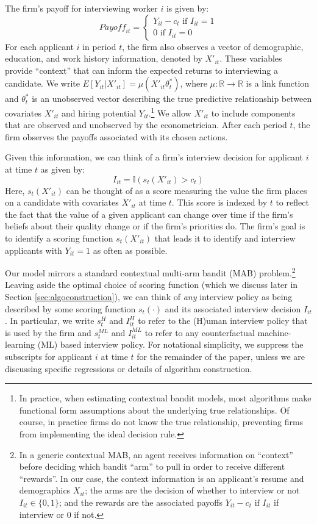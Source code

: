 \documentclass[crop,noquery,editorname,historyrev,nosurname,runningno,sepcount]{RESTUD}
\begin{document}
The firm's payoff for interviewing worker $i$ is given by:
$$
\textit{Payoff}_{it}=
\begin{cases}
Y_{it}-c_t \text{ if } I_{it}=1\\
0 \text{ if } I_{it}=0
\end{cases}
$$
For each applicant $i$ in period $t$, the firm also observes a vector of demographic, education, and work history information, denoted by $X'_{it}$.  These variables provide ``context'' that can inform the expected returns to interviewing a candidate.  We write $E[Y_{it} | X'_{it}]= \mu(X'_{it}\theta_t^*)$, where $\mu: \mathbb{R} \to \mathbb{R}$ is a link function and $\theta_t^*$ is an unobserved vector describing the true predictive relationship between covariates $X'_{it}$ and hiring potential $Y_{it}$.\footnote{In practice, when estimating contextual bandit models, most algorithms make functional form assumptions about the underlying true relationships. Of course, in practice firms do not know the true relationship, preventing firms from implementing the ideal decision rule. } We allow $X'_{it}$ to include components that are observed and unobserved by the econometrician.  After each period $t$, the firm observes the payoffs associated with its chosen actions. 

Given this information, we can think of a firm's interview decision for applicant $i$ at time $t$ as given by:
\begin{equation} \label{interviewpolicy}
I_{it}=\mathbb{I}(s_t(X'_{it}) > c_t)
\end{equation}
Here, $s_t(X'_{it})$ can be thought of as a score measuring the value the firm places on a candidate with covariates $X'_{it}$ at time $t$. This score is indexed by $t$ to reflect the fact that the value of a given applicant can change over time if the firm's beliefs about their quality change or if the firm's priorities do.  The firm's goal is to identify a scoring function $s_t(X'_{it})$ that leads it to identify and interview applicants with $Y_{it}=1$ as often as possible.  

Our model mirrors a standard contextual multi-arm bandit (MAB) problem.\footnote{In a generic contextual MAB, an agent receives information on ``context'' before deciding which bandit ``arm'' to pull in order to receive different ``rewards''.  In our case, the context information is an applicant's resume and demographics $X_{it}$; the arms are the decision of whether to interview or not $I_{it} \in \{0, 1\}$; and the rewards are the associated payoffs $Y_{it}-c_t \text{ if } I_{it}$ if interview or 0 if not.} Leaving aside the optimal choice of scoring function (which we discuss later in Section \ref{sec:algoconstruction}), we can think of \textit{any} interview policy as being described by some scoring function $s_t(\cdot)$ and its associated interview decision $I_{it}$.  In particular, we write $s_t^H$ and $I_{it}^H$ to refer to the (H)uman interview policy that is used by the firm and $s_t^{ML}$ and $I_{it}^{ML}$ to refer to any counterfactual machine-learning (ML) based interview policy.  For notational simplicity, we suppress the subscripts for applicant $i$ at time $t$ for the remainder of the paper, unless we are discussing specific regressions or details of algorithm construction.  
\end{document}
